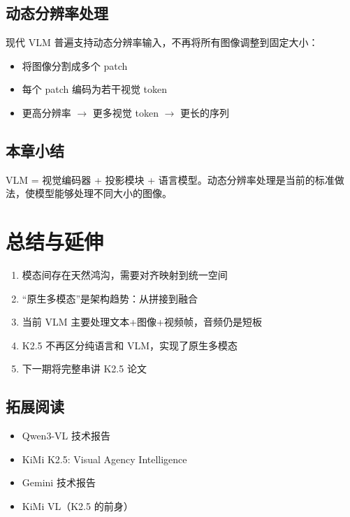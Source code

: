 \documentclass[a4paper]{article}
\begin{document}
\subsection{动态分辨率处理}

现代 VLM 普遍支持动态分辨率输入，不再将所有图像调整到固定大小：
\begin{itemize}
  \item 将图像分割成多个 patch
  \item 每个 patch 编码为若干视觉 token
  \item 更高分辨率 $\to$ 更多视觉 token $\to$ 更长的序列
\end{itemize}

\subsection{本章小结}

VLM = 视觉编码器 + 投影模块 + 语言模型。动态分辨率处理是当前的标准做法，使模型能够处理不同大小的图像。

\section{总结与延伸}

\begin{enumerate}
  \item 模态间存在天然鸿沟，需要对齐映射到统一空间
  \item ``原生多模态''是架构趋势：从拼接到融合
  \item 当前 VLM 主要处理文本+图像+视频帧，音频仍是短板
  \item K2.5 不再区分纯语言和 VLM，实现了原生多模态
  \item 下一期将完整串讲 K2.5 论文
\end{enumerate}

\subsection{拓展阅读}
\begin{itemize}
  \item Qwen3-VL 技术报告
  \item KiMi K2.5: Visual Agency Intelligence
  \item Gemini 技术报告
  \item KiMi VL（K2.5 的前身）
\end{itemize}
\end{document}
